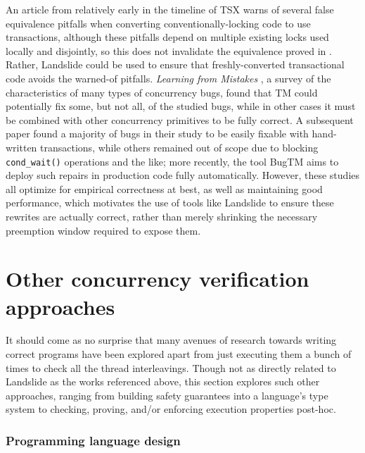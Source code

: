 An article from relatively early in the timeline of TSX \cite{htm-subtleties}
warns of several false equivalence pitfalls when converting conventionally-locking code to use transactions,
although these pitfalls depend on multiple existing locks used locally and disjointly,
so this does not invalidate the equivalence proved in \sect{\ref{sec:tm-design-locks}}.
Rather, Landslide could be used to ensure that freshly-converted transactional code avoids the warned-of pitfalls.
{\em Learning from Mistakes} \cite{learning-from-mistakes},
a survey of the characteristics of many types of concurrency bugs,
found that TM could potentially fix some, but not all, of the studied bugs,
while in other cases it must be combined with other concurrency primitives to be fully correct.
A subsequent paper \cite{applying-tm-bugs}
found a majority of bugs in their study to be easily fixable with hand-written transactions,
while others remained out of scope due to blocking {\tt cond\_wait()} operations and the like;
more recently, the tool BugTM \cite{bugtm} aims to deploy such repairs in production code fully automatically.
However, these studies all optimize for empirical correctness at best,
as well as maintaining good performance,
which motivates the use of tools like Landslide to ensure these rewrites
are actually correct,
rather than merely shrinking the necessary preemption window required to expose them.


\section{Other concurrency verification approaches}

It should come as no surprise that many avenues of research towards writing correct programs
have been explored
apart from just executing them a bunch of times to check all the thread interleavings.
Though not as directly related to Landslide as the works referenced above,
this section explores such other approaches,
ranging from building safety guarantees into a language's type system
to checking, proving, and/or enforcing execution properties post-hoc.

\subsubsection{Programming language design}


